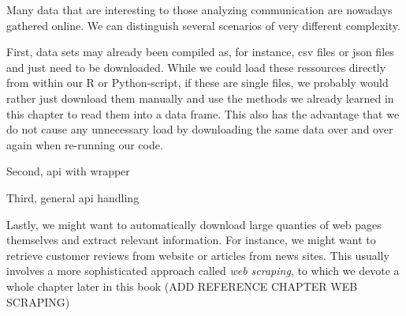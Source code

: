 
Many data that are interesting to those analyzing communication are nowadays gathered online.
We can distinguish several scenarios of very different complexity.

First, data sets may already been compiled as, for instance, csv files or json files and just need to be downloaded.
While we could load these ressources directly from within our R or Python-script, if these are single files, we probably would rather just download them manually and use the methods we already learned in this chapter to read them into a data frame. This also has the advantage that we do not cause any unnecessary load by downloading the same data over and over again when re-running our code.

Second, api with wrapper

Third, general api handling

Lastly, we might want to automatically download large quanties of web pages themselves and extract relevant information. For instance, we might want to retrieve customer reviews from website or articles from news sites. This usually involves a more sophisticated approach called \emph{web scraping}, to which we devote a whole chapter later in this book (ADD REFERENCE CHAPTER WEB SCRAPING)




